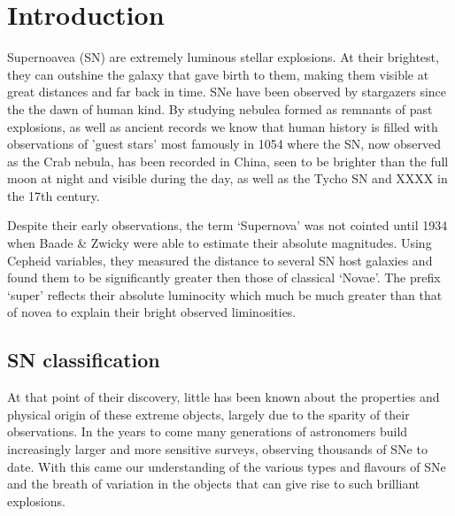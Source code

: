 \chapter{Introduction}  \label{Chapter1}

Supernoavea (SN) are extremely luminous stellar explosions. At their brightest, they can outshine the galaxy that gave birth to them, making them visible at great distances and far back in time. SNe have been observed by stargazers since the the dawn of human kind. By studying nebulea formed as remnants of past explosions, as well as ancient records we know that human history is filled with observations of 'guest stars' most famously in 1054 where the SN, now observed as the Crab nebula, has been recorded in China, seen to be brighter than the full moon at night and visible during the day, as well as the Tycho SN and XXXX in the 17th century.

Despite their early observations, the term `Supernova' was not cointed until 1934 when Baade \& Zwicky were able to estimate their absolute magnitudes. Using Cepheid variables, they measured the distance to several SN host galaxies and found them to be significantly greater then those of classical `Novae'. The prefix `super' reflects their absolute luminocity which much be much greater than that of novea to explain their bright observed liminosities.

\section{SN classification}
At that point of their discovery, little has been known about the properties and physical origin of these extreme objects, largely due to the sparity of their observations. In the years to come many generations of astronomers build increasingly larger and more sensitive surveys, observing thousands of SNe to date. With this came our understanding of the various types and flavours of SNe and the breath of variation in the objects that can give
rise to such brilliant explosions.

